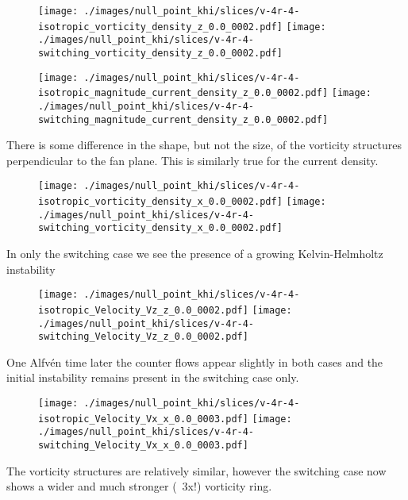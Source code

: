 \begin{figure}[H]
  \centering
  \texttt{[image: ./images/null\_point\_khi/slices/v-4r-4-isotropic\_vorticity\_density\_z\_0.0\_0002.pdf]}
  \texttt{[image: ./images/null\_point\_khi/slices/v-4r-4-switching\_vorticity\_density\_z\_0.0\_0002.pdf]}
\end{figure}

\begin{figure}[H]
  \centering
  \texttt{[image: ./images/null\_point\_khi/slices/v-4r-4-isotropic\_magnitude\_current\_density\_z\_0.0\_0002.pdf]}
  \texttt{[image: ./images/null\_point\_khi/slices/v-4r-4-switching\_magnitude\_current\_density\_z\_0.0\_0002.pdf]}
\end{figure}

There is some difference in the shape, but not the size, of the vorticity structures perpendicular to the fan plane. This is similarly true for the current density.

\begin{figure}[H]
  \centering
  \texttt{[image: ./images/null\_point\_khi/slices/v-4r-4-isotropic\_vorticity\_density\_x\_0.0\_0002.pdf]}
  \texttt{[image: ./images/null\_point\_khi/slices/v-4r-4-switching\_vorticity\_density\_x\_0.0\_0002.pdf]}
\end{figure}

In only the switching case we see the presence of a growing Kelvin-Helmholtz instability

\begin{figure}[H]
  \centering
  \texttt{[image: ./images/null\_point\_khi/slices/v-4r-4-isotropic\_Velocity\_Vz\_z\_0.0\_0002.pdf]}
  \texttt{[image: ./images/null\_point\_khi/slices/v-4r-4-switching\_Velocity\_Vz\_z\_0.0\_0002.pdf]}
\end{figure}

One Alfv\'en time later the counter flows appear slightly in both cases and the initial instability remains present in the switching case only.

\begin{figure}[H]
  \centering
  \texttt{[image: ./images/null\_point\_khi/slices/v-4r-4-isotropic\_Velocity\_Vx\_x\_0.0\_0003.pdf]}
  \texttt{[image: ./images/null\_point\_khi/slices/v-4r-4-switching\_Velocity\_Vx\_x\_0.0\_0003.pdf]}
\end{figure}

The vorticity structures are relatively similar, however the switching case now shows a wider and much stronger (~3x!) vorticity ring.


